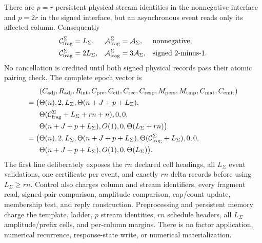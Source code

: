 \begin{theorem}
There are $p=r$ persistent physical stream identities in the nonnegative
interface and $p=2r$ in the signed interface, but an asynchronous event reads
only its affected column.  Consequently
\begin{align}
 \mathcal C_{\rm frag}^{\Sigma}
 &=L_\Sigma,
 &
 \mathcal A_{\rm frag}^{\Sigma}
 &=\mathcal A_\Sigma,
 &&\text{nonnegative},
 \notag\\
 \mathcal C_{\rm frag}^{\Sigma}
 &=2L_\Sigma,
 &
 \mathcal A_{\rm frag}^{\Sigma}
 &=3\mathcal A_\Sigma,
 &&\text{signed $2$-minus-$1$}.
 \label{eq:notched-sun-columnwise-amplitude-fragments}
\end{align}
No cancellation is credited until both signed physical records pass their
atomic pairing check.  The complete epoch vector is
\begin{equation}
 \begin{aligned}
 &(C_{\rm adj},R_{\rm adj},R_{\rm int},C_{\rm pre},C_{\rm ctl},C_{\rm rec},
 C_{\rm resp},M_{\rm pers},M_{\rm tmp},C_{\rm mat},C_{\rm emit})\\
 =\bigl(&\Theta(n),2,L_\Sigma,\Theta(n+J+p+L_\Sigma),\\
 &\Theta(\mathcal C_{\rm frag}^{\Sigma}+L_\Sigma+rn+n),0,0,\\
 &\Theta(n+J+p+L_\Sigma),O(1),0,
 \Theta(L_\Sigma+rn)\bigr)\\
 =\bigl(&\Theta(n),2,L_\Sigma,\Theta(n+J+p+L_\Sigma),
 \Theta(\mathcal C_{\rm frag}^{\Sigma}+L_\Sigma),0,0,\\
 &\Theta(n+J+p+L_\Sigma),O(1),0,\Theta(L_\Sigma)\bigr).
 \end{aligned}
 \label{eq:notched-sun-columnwise-amplitude-eleven-vector}
\end{equation}
The first line deliberately exposes the $rn$ declared cell headings, all
$L_\Sigma$ event validations, one certificate per event, and exactly $rn$
delta records before using $L_\Sigma\geq rn$.  Control also charges column and
stream identifiers, every fragment read, signed-pair comparison, amplitude
comparison, cap/count update, membership test, and reply construction.
Preprocessing and persistent memory charge the template, ladder, $p$ stream
identities, $rn$ schedule headers, all $L_\Sigma$ amplitude/prefix cells, and
per-column margins.  There is no factor application, numerical recurrence,
response-state write, or numerical materialization.


\end{theorem}
